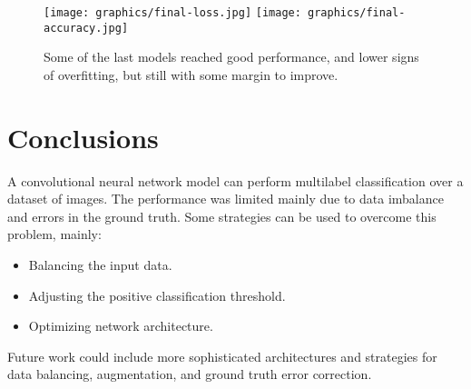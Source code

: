 \documentclass{article}
\begin{document}
\begin{figure}[ht]
  \centering
  \texttt{[image: graphics/final-loss.jpg]}
  \texttt{[image: graphics/final-accuracy.jpg]}
  \caption{Some of the last models reached good performance, and lower signs of overfitting, but still with some margin to improve.}
\end{figure}

\section{Conclusions}
A convolutional neural network model can perform multilabel classification over a dataset of images.
The performance was limited mainly due to data imbalance and errors in the ground truth.
Some strategies can be used to overcome this problem, mainly:

\begin{itemize}
  \item Balancing the input data.
  \item Adjusting the positive classification threshold.
  \item Optimizing network architecture.
\end{itemize}

Future work could include more sophisticated architectures and strategies for data balancing, augmentation, and ground truth error correction.
\end{document}
